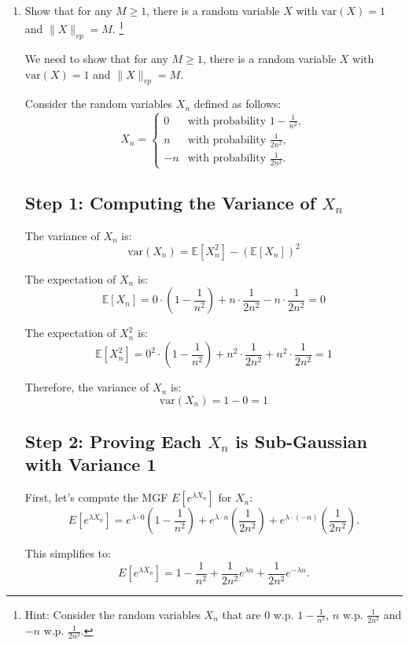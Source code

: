 \documentclass[a4 paper]{article}
\theoremstyle{boldStyle}
\theoremstyle{boldBlueStyle}
\theoremstyle{boldPurpleStyle}
\theoremstyle{boldRedStyle}
\begin{document}
\begin{enumerate}
\newpage
\item \textcolor{blueColor}{Show that for any \(M \geq 1\), there is a random variable \(X\) with \(\mathrm{var}(X) = 1\) and \(\|X\|_{vp} = M\).}
\footnote{Hint: Consider the random variables \(X_n\) that are 0 w.p. \(1-\frac{1}{n^2}\), \(n\) w.p. \(\frac{1}{2n^2}\) and \(-n\) w.p. \(\frac{1}{2n^2}\).}



We need to show that for any \(M \geq 1\), there is a random variable \(X\) with \(\mathrm{var}(X) = 1\) and \(\|X\|_{vp} = M\).

Consider the random variables \(X_n\) defined as follows:
\[
X_n = \begin{cases} 
0 & \text{with probability } 1 - \frac{1}{n^2}, \\
n & \text{with probability } \frac{1}{2n^2}, \\
-n & \text{with probability } \frac{1}{2n^2}.
\end{cases}
\]

\subsection*{Step 1: Computing the Variance of $X_n$}

The variance of \(X_n\) is:
\[
\mathrm{var}(X_n) = \mathbb{E}[X_n^2] - (\mathbb{E}[X_n])^2
\]

The expectation of \(X_n\) is:
\[
\mathbb{E}[X_n] = 0 \cdot \left(1 - \frac{1}{n^2}\right) + n \cdot \frac{1}{2n^2} - n \cdot \frac{1}{2n^2} = 0
\]

The expectation of \(X_n^2\) is:
\[
\mathbb{E}[X_n^2] = 0^2 \cdot \left(1 - \frac{1}{n^2}\right) + n^2 \cdot \frac{1}{2n^2} + n^2 \cdot \frac{1}{2n^2} = 1
\]

Therefore, the variance of \(X_n\) is:
\[
\mathrm{var}(X_n) = 1 - 0 = 1
\]


\subsection*{Step 2: Proving Each $X_n$ is Sub-Gaussian with Variance 1}

First, let's compute the MGF $E[e^{\lambda X_n}]$ for $X_n$:
\[
E[e^{\lambda X_n}] = e^{\lambda \cdot 0} \left(1 - \frac{1}{n^2}\right) + e^{\lambda \cdot n} \left(\frac{1}{2n^2}\right) + e^{\lambda \cdot (-n)} \left(\frac{1}{2n^2}\right).
\]

This simplifies to:
\[
E[e^{\lambda X_n}] = 1 - \frac{1}{n^2} + \frac{1}{2n^2} e^{\lambda n} + \frac{1}{2n^2} e^{-\lambda n}.
\]


\end{enumerate}
\end{document}
